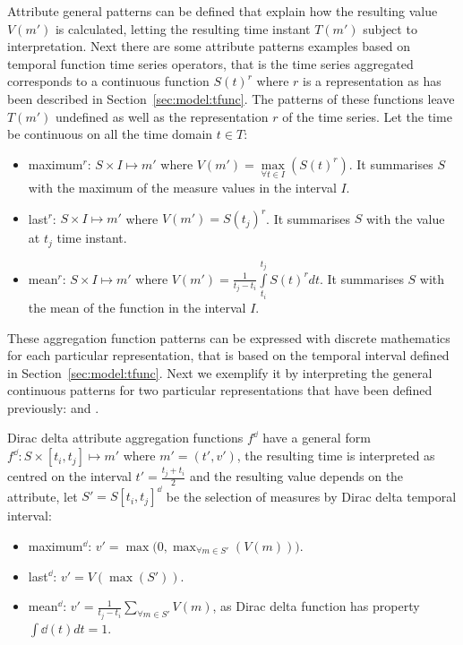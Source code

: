 Attribute general patterns can be defined that explain how the
resulting value $V(m')$ is calculated, letting the resulting time
instant $T(m')$ subject to interpretation.  Next there are some
attribute patterns examples based on temporal function time series
operators, that is the time series aggregated corresponds to a
continuous function $S(t)^r$ where $r$ is a representation as has been
described in Section~\ref{sec:model:tfunc}. The patterns of these
functions leave $T(m')$ undefined as well as the representation $r$ of
the time series. Let the time be continuous on all the time domain
$t\in T$:
\begin{itemize}
\item maximum$^r$: $S \times I \mapsto m'$ where $V(m') =
  \max\limits_{\forall t \in I}(S(t)^r)$. It summarises $S$ with the maximum
  of the measure values in the interval $I$.
\item last$^r$: $S \times I \mapsto m'$ where $V(m') = S(t_j)^r$. It
  summarises $S$ with the value at $t_j$ time instant.
\item mean$^r$: $S \times I \mapsto m'$ where $V(m') =
  \frac{1}{t_j-t_i} \int\limits_{t_i}^{t_j} S(t)^r dt$. It summarises $S$
  with the mean of the function in the interval $I$.
\end{itemize}


These aggregation function patterns can be expressed with discrete
mathematics for each particular representation, that is based on the
temporal interval defined in Section~\ref{sec:model:tfunc}. Next we
exemplify it by interpreting the general continuous patterns for two
particular representations that have been defined previously: \dd{}
and \zohe{}.


Dirac delta attribute aggregation functions $f^\dd$ have a general
form $f^\dd : S \times [t_i,t_j]\mapsto m'$ where $m'=(t',v')$, the
resulting time is interpreted as centred on the interval
$t'=\frac{t_j+t_i}{2}$ and the resulting value depends on the
attribute, let $S'=S[t_i,t_j]^\dd$ be the selection of measures by
Dirac delta temporal interval:
\begin{itemize}
\item maximum$^\dd$: $v' = \max\big(0,\max_{\forall m \in S'}(V(m))\big)$. 
\item last$^\dd$: $v' = V(\max(S'))$.
\item mean$^\dd$: $v' = \frac{1}{t_j-t_i} \sum\limits_{\forall m
    \in S'} V(m)$, as Dirac delta function has property $\int\dd(t)dt=1$.
\end{itemize}

